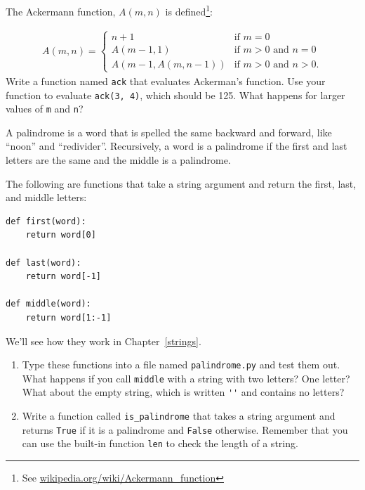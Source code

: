 \documentclass[10pt]{book}
\begin{document}
\begin{ex}

The Ackermann function, $A(m, n)$ is defined\footnote{See
  \url{wikipedia.org/wiki/Ackermann_function}}:

\begin{eqnarray}
A(m, n) = \begin{cases} 
              n+1 & \mbox{if } m = 0 \\ 
        A(m-1, 1) & \mbox{if } m > 0 \mbox{ and } n = 0 \\ 
A(m-1, A(m, n-1)) & \mbox{if } m > 0 \mbox{ and } n > 0.
\end{cases} 
\end{eqnarray}
%
Write a function named {\tt ack} that evaluates Ackerman's function.
Use your function to evaluate {\tt ack(3, 4)}, which should be 125.
What happens for larger values of {\tt m} and {\tt n}?

\end{ex}


\begin{ex}
\label{palindrome}


A palindrome is a word that is spelled the same backward and
forward, like ``noon'' and ``redivider''.  Recursively, a word
is a palindrome if the first and last letters are the same
and the middle is a palindrome.

The following are functions that take a string argument and
return the first, last, and middle letters:

\beforeverb
\begin{verbatim}
def first(word):
    return word[0]

def last(word):
    return word[-1]

def middle(word):
    return word[1:-1]
\end{verbatim}
\afterverb
%
We'll see how they work in Chapter~\ref{strings}.

\begin{enumerate}

\item Type these functions into a file named {\tt palindrome.py}
and test them out.  What happens if you call {\tt middle} with
a string with two letters?  One letter?  What about the empty
string, which is written \verb"''" and contains no letters?

\item Write a function called \verb"is_palindrome" that takes
a string argument and returns {\tt True} if it is a palindrome
and {\tt False} otherwise.  Remember that you can use the
built-in function {\tt len} to check the length of a string.

\end{enumerate}

\end{ex}
\end{document}
